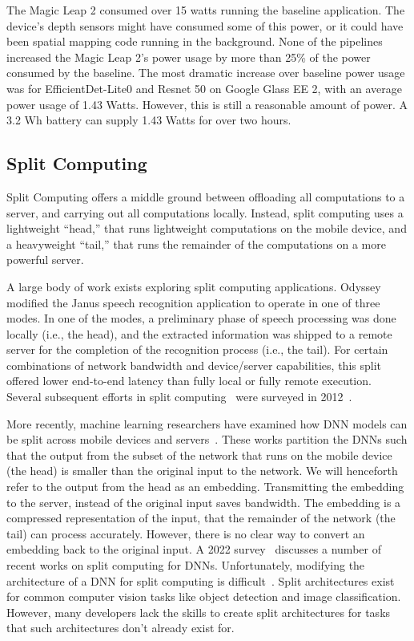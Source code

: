 The Magic Leap 2 consumed over 15 watts running the baseline application.
The device's depth sensors might have consumed some of this power, or it could
have been spatial mapping code running in the background.
None of the pipelines increased the Magic Leap 2's power usage by more than 25\%
of the power consumed by the baseline.
The most dramatic increase over baseline power usage was for EfficientDet-Lite0
and Resnet 50 on Google Glass EE 2, with an average power usage of 1.43 Watts.
However, this is still a reasonable amount of power.
A 3.2 Wh battery can supply 1.43 Watts for over two hours.

\subsection{Split Computing}

Split Computing offers a middle ground between offloading all computations to a
server, and carrying out all computations locally.
Instead, split computing uses a lightweight ``head,'' that runs lightweight
computations on the mobile device, and a heavyweight ``tail,'' that runs the
remainder of the computations on a more powerful server.

A large body of work exists exploring split computing applications.
Odyssey~\cite{Noble1997} modified the Janus speech recognition application to
operate in one of three modes.
In one of the modes, a preliminary phase of speech
processing was done locally (i.e., the head), and the extracted
information was shipped to a remote server for the completion of the
recognition process (i.e., the tail).
For certain combinations of
network bandwidth and device/server capabilities, this split offered
lower end-to-end latency than fully local or fully remote execution.
Several subsequent efforts in split computing~\cite{Balan2002, Flinn2001,
  Flinn2003b, Narayanan2003, Goyal2004, Su2005, Ok2007, Balan2007,
  Kristensen2008} were surveyed in 2012~\cite{Flinn2012}.

More recently, machine learning researchers have examined how DNN models can be
split across mobile devices and servers~\cite{Kang2017, Hsu2019, Eshratifar2019,
  Matsubara2019}.
These works partition the DNNs such that the output from the subset of the
network that runs on the mobile device (the head) is smaller than the
original input to the network.
We will henceforth refer to the output from the head as an embedding.
Transmitting the embedding to the server, instead of the original input saves
bandwidth.
The embedding is a compressed representation of the input, that the remainder of
the network (the tail) can process accurately.
However, there is no clear way to convert an embedding back to the original
input.
A 2022 survey~\cite{Matsubara2022} discusses a number of recent works on split
computing for DNNs.
Unfortunately, modifying the architecture of a DNN for split computing is
difficult~\cite{Matsubara2020}.
Split architectures exist for common computer vision tasks like object detection
and image classification.
However, many developers lack the skills to create split architectures for tasks
that such architectures don't already exist for.

